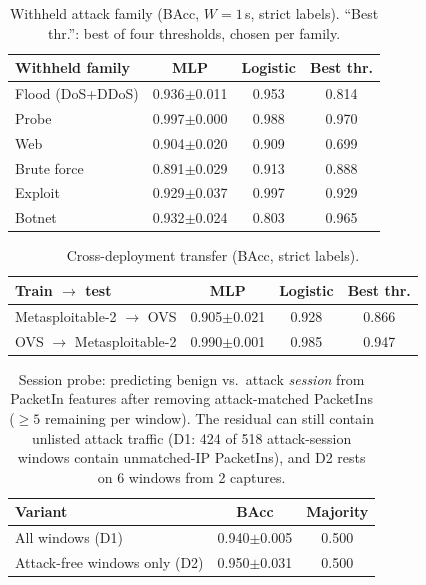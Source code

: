 \begin{table}[t]
\caption{Withheld attack family (BAcc, $W{=}1$\,s, strict labels). ``Best thr.'': best of four thresholds, chosen per family.}
\label{tab:family}
\centering\footnotesize\setlength{\tabcolsep}{3pt}
\begin{tabular}{lccc}
\toprule
Withheld family & MLP & Logistic & Best thr. \\
\midrule
Flood (DoS+DDoS) & 0.936{\scriptsize$\pm$0.011} & 0.953 & 0.814 \\
Probe & 0.997{\scriptsize$\pm$0.000} & 0.988 & 0.970 \\
Web & 0.904{\scriptsize$\pm$0.020} & 0.909 & 0.699 \\
Brute force & 0.891{\scriptsize$\pm$0.029} & 0.913 & 0.888 \\
Exploit & 0.929{\scriptsize$\pm$0.037} & 0.997 & 0.929 \\
Botnet & 0.932{\scriptsize$\pm$0.024} & 0.803 & 0.965 \\
\bottomrule
\end{tabular}
\end{table}

\begin{table}[t]
\caption{Cross-deployment transfer (BAcc, strict labels).}
\label{tab:cross}
\centering\footnotesize\setlength{\tabcolsep}{3pt}
\begin{tabular}{lccc}
\toprule
Train $\rightarrow$ test & MLP & Logistic & Best thr. \\
\midrule
Metasploitable-2 $\rightarrow$ OVS & 0.905{\scriptsize$\pm$0.021} & 0.928 & 0.866 \\
OVS $\rightarrow$ Metasploitable-2 & 0.990{\scriptsize$\pm$0.001} & 0.985 & 0.947 \\
\bottomrule
\end{tabular}
\end{table}

\begin{table}[t]
\caption{Session probe: predicting benign vs.\ attack {\normalfont\itshape session} from PacketIn features after removing attack-matched PacketIns (${\ge}5$ remaining per window). The residual can still contain unlisted attack traffic (D1: 424 of 518 attack-session windows contain unmatched-IP PacketIns), and D2 rests on 6 windows from 2 captures.}
\label{tab:confound}
\centering\footnotesize\setlength{\tabcolsep}{3pt}
\begin{tabular}{lcc}
\toprule
Variant & BAcc & Majority \\
\midrule
All windows (D1) & 0.940{\scriptsize$\pm$0.005} & 0.500 \\
Attack-free windows only (D2) & 0.950{\scriptsize$\pm$0.031} & 0.500 \\
\bottomrule
\end{tabular}
\end{table}

